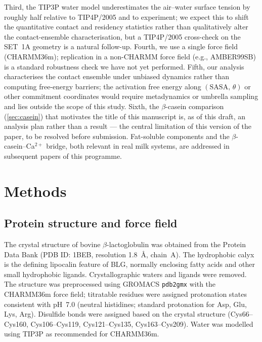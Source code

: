 \documentclass[11pt,a4paper]{article}
\begin{document}
Third, the TIP3P water model underestimates the air--water surface
tension by roughly half relative to TIP4P/2005 and to
experiment\citep{Vega2007}; we expect this to shift the quantitative
contact and residency statistics rather than qualitatively alter the
contact-ensemble characterisation, but a TIP4P/2005 cross-check on the
SET~1A geometry is a natural follow-up. Fourth, we use a single force
field (CHARMM36m); replication in a non-CHARMM force field (e.g.,
AMBER99SB) is a standard robustness check we have not yet performed.
Fifth, our analysis characterises the contact ensemble under unbiased
dynamics rather than computing free-energy barriers; the activation
free energy along $(\mathrm{SASA},\,\theta)$ or other commitment
coordinates would require metadynamics\citep{Laio2002} or umbrella
sampling and lies outside the scope of this study. Sixth, the $\beta$-casein comparison (\cref{sec:casein}) that motivates
the title of this manuscript is, as of this draft, an analysis plan
rather than a result --- the central limitation of this version of the
paper, to be resolved before submission. Fat-soluble components and the
$\beta$-casein--Ca$^{2+}$ bridge, both relevant in real milk systems, are
addressed in subsequent papers of this programme.

\section*{Methods}

\subsection*{Protein structure and force field}

The crystal structure of bovine $\beta$-lactoglobulin was obtained from
the Protein Data Bank (PDB ID: 1BEB, resolution \SI{1.8}{\angstrom},
chain~A)\citep{Brownlow1997,Kontopidis2004}. The hydrophobic calyx is
the defining lipocalin feature of BLG, normally enclosing fatty acids
and other small hydrophobic ligands\citep{Loch2013}. Crystallographic waters and ligands were
removed. The structure was preprocessed using GROMACS \texttt{pdb2gmx}
with the CHARMM36m force field\citep{Huang2017}; titratable residues
were assigned protonation states consistent with pH~7.0 (neutral
histidines; standard protonation for Asp, Glu, Lys, Arg). Disulfide
bonds were assigned based on the crystal structure (Cys66--Cys160,
Cys106--Cys119, Cys121--Cys135, Cys163--Cys209). Water was modelled
using TIP3P\citep{Jorgensen1983} as recommended for CHARMM36m.
\end{document}
